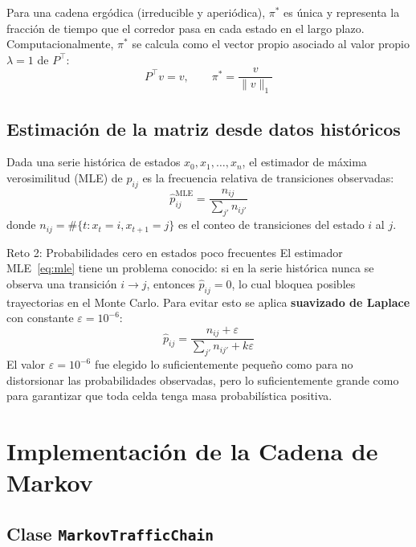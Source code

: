 \documentclass[11pt,a4paper]{article}
\begin{document}
Para una cadena ergódica (irreducible y aperiódica), $\pi^*$ es única y representa la fracción de tiempo que el corredor pasa en cada estado en el largo plazo. Computacionalmente, $\pi^*$ se calcula como el vector propio asociado al valor propio $\lambda = 1$ de $P^\top$:
\begin{equation}
P^\top v = v, \qquad \pi^* = \frac{v}{\|v\|_1}
\end{equation}

\subsection{Estimación de la matriz desde datos históricos}

Dada una serie histórica de estados $x_0, x_1, \ldots, x_n$, el estimador de máxima verosimilitud (MLE) de $p_{ij}$ es la frecuencia relativa de transiciones observadas:
\begin{equation}
\hat{p}_{ij}^{\text{MLE}} = \frac{n_{ij}}{\sum_{j'} n_{ij'}}
\label{eq:mle}
\end{equation}
donde $n_{ij} = \#\{t : x_t = i, x_{t+1} = j\}$ es el conteo de transiciones del estado $i$ al $j$.

\begin{challengebox}{Reto 2: Probabilidades cero en estados poco frecuentes}
El estimador MLE~\eqref{eq:mle} tiene un problema conocido: si en la serie histórica nunca se observa una transición $i \to j$, entonces $\hat{p}_{ij} = 0$, lo cual bloquea posibles trayectorias en el Monte Carlo. Para evitar esto se aplica \textbf{suavizado de Laplace} con constante $\varepsilon = 10^{-6}$:
\begin{equation}
\hat{p}_{ij} = \frac{n_{ij} + \varepsilon}{\sum_{j'} n_{ij'} + k\varepsilon}
\label{eq:laplace}
\end{equation}
El valor $\varepsilon = 10^{-6}$ fue elegido lo suficientemente pequeño como para no distorsionar las probabilidades observadas, pero lo suficientemente grande como para garantizar que toda celda tenga masa probabilística positiva.
\end{challengebox}

\section{Implementación de la Cadena de Markov}

\subsection{Clase \texttt{MarkovTrafficChain}}
\end{document}
